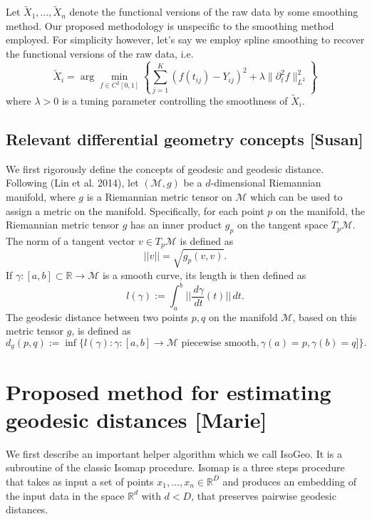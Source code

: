 \documentclass[]{article}
\begin{document}
Let \(\tilde X_1,\ldots,\tilde X_n\) denote the functional versions of
the raw data by some smoothing method. Our proposed methodology is
unspecific to the smoothing method employed. For simplicity however,
let's say we employ spline smoothing to recover the functional versions
of the raw data, i.e.\\
\[ \tilde X_i = \arg\min_{f\in C^2[0,1]}\left\{\sum_{j=1}^{K}\left(f(t_{ij})-Y_{ij}\right)^2+\lambda \|\partial^2_tf\|^2_{L^2}\right\}\]
where \(\lambda>0\) is a tuning parameter controlling the smoothness of
\(\tilde X_i\).

\hypertarget{relevant-differential-geometry-concepts-susan}{%
\subsection{Relevant differential geometry concepts
{[}Susan{]}}\label{relevant-differential-geometry-concepts-susan}}

We first rigorously define the concepts of geodesic and geodesic
distance. Following (Lin et al. 2014), let \((\mathcal{M},g)\) be a
\(d\)-dimensional Riemannian manifold, where \(g\) is a Riemannian
metric tensor on \(\mathcal{M}\) which can be used to assign a metric on
the manifold. Specifically, for each point \(p\) on the manifold, the
Riemannian metric tensor \(g\) has an inner product \(g_p\) on the
tangent space \(T_p \mathcal{M}\). The norm of a tangent vector
\(v \in T_p \mathcal{M}\) is defined as \[||v|| = \sqrt{g_p(v,v)}.\] If
\(\gamma: [a,b] \subset \mathbb{R}\to \mathcal{M}\) is a smooth curve,
its length is then defined as
\[ l(\gamma) := \int_a^b || \frac{\,d\gamma}{\,d t}(t) || \,dt .\] The
geodesic distance between two points \(p,q\) on the manifold
\(\mathcal{M}\), based on this metric tensor \(g\), is defined as
\[ d_g(p,q):=\inf \{l(\gamma): \gamma:[a,b] \to \mathcal{M}\text{ piecewise smooth}, \gamma(a) = p, \gamma(b) = q]  \}.\]

\hypertarget{proposed-method-for-estimating-geodesic-distances-marie}{%
\section{Proposed method for estimating geodesic distances
{[}Marie{]}}\label{proposed-method-for-estimating-geodesic-distances-marie}}

We first describe an important helper algorithm which we call IsoGeo. It
is a subroutine of the classic Isomap procedure. Isomap is a three steps
procedure that takes as input a set of points
\(x_1,\ldots,x_n\in \mathbb{R}^D\) and produces an embedding of the
input data in the space \(\mathbb{R}^d\) with \(d<D\), that preserves
pairwise geodesic distances.
\end{document}
